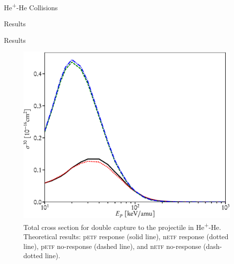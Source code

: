 \documentclass[letterpaper, 11 pt]{report}
\begin{document}
\begin{chapter}{\texorpdfstring{He\textsuperscript{+}}{He+}-He Collisions \label{chap:hephe}}
\begin{section}{Results \label{sec:hephe-disc}}
\begin{subsection}{Results \label{sec:hephe-res}}
\begin{figure}[t]
\begin{minipage}{.49\linewidth}
               \includegraphics[width = \linewidth]{./images/hephe-cross/HepHe-030.eps}
               \caption[Total cross section for double capture to the projectile in
                        He\textsuperscript{+}-He]
                       {Total cross section for double capture to the projectile in
                        He\textsuperscript{+}-He.
                        Theoretical results: p\textsc{etf} response (solid line), n\textsc{etf} response
                                             (dotted line), p\textsc{etf} no-response (dashed line), and
                                             n\textsc{etf} no-response (dash-dotted line).
                        \label{fig:cs030}}
            \end{minipage}
         \end{figure}


\end{subsection}
\end{section}
\end{chapter}
\end{document}
